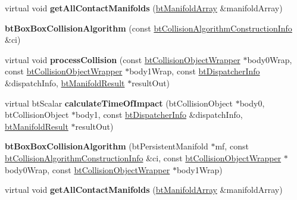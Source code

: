 \begin{DoxyCompactItemize}
\item 
\mbox{\label{classbtBoxBoxCollisionAlgorithm_a72753c4d2da0fcb58d24f1b3f601712d}} 
virtual void {\bfseries get\+All\+Contact\+Manifolds} (\hyperlink{classbtAlignedObjectArray}{bt\+Manifold\+Array} \&manifold\+Array)
\item 
\mbox{\label{classbtBoxBoxCollisionAlgorithm_a7e3155fbdc5ffe12264832ace89ebd39}} 
{\bfseries bt\+Box\+Box\+Collision\+Algorithm} (const \hyperlink{structbtCollisionAlgorithmConstructionInfo}{bt\+Collision\+Algorithm\+Construction\+Info} \&ci)
\item 
\mbox{\label{classbtBoxBoxCollisionAlgorithm_a8c84b97dd427c4621eb8b0bccb907c46}} 
virtual void {\bfseries process\+Collision} (const \hyperlink{structbtCollisionObjectWrapper}{bt\+Collision\+Object\+Wrapper} $\ast$body0\+Wrap, const \hyperlink{structbtCollisionObjectWrapper}{bt\+Collision\+Object\+Wrapper} $\ast$body1\+Wrap, const \hyperlink{structbtDispatcherInfo}{bt\+Dispatcher\+Info} \&dispatch\+Info, \hyperlink{classbtManifoldResult}{bt\+Manifold\+Result} $\ast$result\+Out)
\item 
\mbox{\label{classbtBoxBoxCollisionAlgorithm_a249c4d8d7f1dea4d051e122e915d40af}} 
virtual bt\+Scalar {\bfseries calculate\+Time\+Of\+Impact} (bt\+Collision\+Object $\ast$body0, bt\+Collision\+Object $\ast$body1, const \hyperlink{structbtDispatcherInfo}{bt\+Dispatcher\+Info} \&dispatch\+Info, \hyperlink{classbtManifoldResult}{bt\+Manifold\+Result} $\ast$result\+Out)
\item 
\mbox{\label{classbtBoxBoxCollisionAlgorithm_a40dbeba5e546755c3e3bc931bf658a9e}} 
{\bfseries bt\+Box\+Box\+Collision\+Algorithm} (bt\+Persistent\+Manifold $\ast$mf, const \hyperlink{structbtCollisionAlgorithmConstructionInfo}{bt\+Collision\+Algorithm\+Construction\+Info} \&ci, const \hyperlink{structbtCollisionObjectWrapper}{bt\+Collision\+Object\+Wrapper} $\ast$body0\+Wrap, const \hyperlink{structbtCollisionObjectWrapper}{bt\+Collision\+Object\+Wrapper} $\ast$body1\+Wrap)
\item 
\mbox{\label{classbtBoxBoxCollisionAlgorithm_a72753c4d2da0fcb58d24f1b3f601712d}} 
virtual void {\bfseries get\+All\+Contact\+Manifolds} (\hyperlink{classbtAlignedObjectArray}{bt\+Manifold\+Array} \&manifold\+Array)
\end{DoxyCompactItemize}
